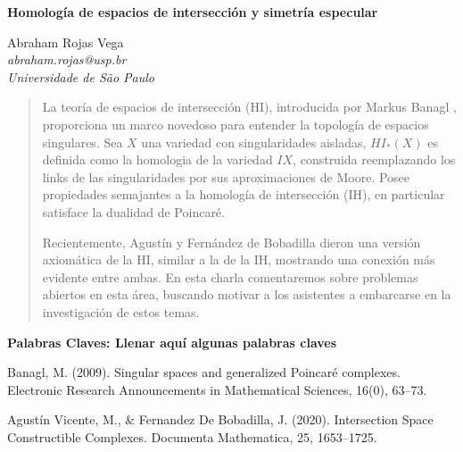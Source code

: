 \documentclass[12pt,a4paper]{article}
\begin{document}
\pagestyle{fancy}

\begin{center}
{\large  \textbf{Homología de espacios de intersección y simetría especular}}
\end{center}


\begin{center}
{{Abraham Rojas Vega}\\
{\it {abraham.rojas@usp.br}\\
\small{Universidade de São Paulo}}}\\
\end{center}


\begin{abstract}

La teoría de espacios de intersección (HI), introducida por Markus Banagl \cite{Referencia1}, proporciona un marco novedoso para entender la topología de espacios singulares. Sea $X$ una variedad con singularidades aisladas, $HI_*(X)$ es definida como la homologia de la variedad $IX$, construida reemplazando los links de las singularidades por sus aproximaciones de Moore. Posee propiedades semajantes a la homología de intersección (IH), en particular satisface la dualidad de Poincaré. 

Recientemente, Agustín y Fernández de Bobadilla \cite{Referencia2} dieron una versión axiomática de la HI, similar a la de la IH, mostrando una conexión más evidente entre ambas. En esta charla comentaremos sobre problemas abiertos en esta área, buscando motivar a los asistentes a embarcarse en la investigación de estos temas.

    
\end{abstract}


\noindent\textbf{Palabras Claves: Llenar aquí algunas palabras claves} 



\begin{thebibliography}{10}
Banagl, M. (2009). Singular spaces and generalized Poincaré complexes. Electronic Research Announcements in Mathematical Sciences, 16(0), 63–73.


Agustín Vicente, M., \& Fernandez De Bobadilla, J. (2020). Intersection Space Constructible Complexes. Documenta Mathematica, 25, 1653–1725.

\end{thebibliography}
\end{document}
